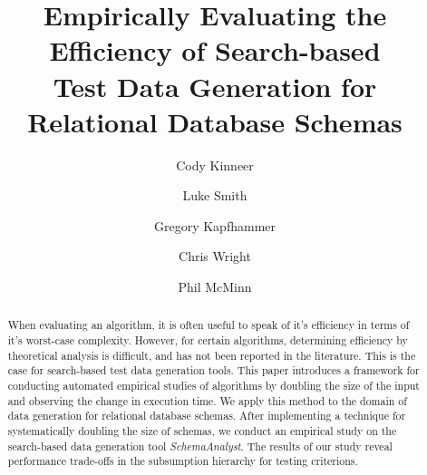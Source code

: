 \documentclass[times,10pt,twocolumn]{article}
\begin{document}
\title{Empirically Evaluating the Efficiency of Search-based \\ Test Data
Generation for Relational Database Schemas}

\author{Cody Kinneer         \and
        Luke Smith \and
        Gregory Kapfhammer \and
        Chris Wright \and
        Phil McMinn
}


\maketitle

\begin{abstract}
When evaluating an algorithm, it is often useful to speak of it's
efficiency in terms of it's worst-case complexity.  However, for certain
algorithms, determining efficiency by theoretical analysis is difficult,
and has not been reported in the literature. This is the case for
search-based test data generation tools. This paper introduces a
framework for conducting automated empirical studies of algorithms by
doubling the size of the input and observing the change in execution
time. We apply this method to the domain of data generation for
relational database schemas.  After implementing a technique for
systematically doubling the size of schemas, we conduct an empirical study
on the search-based data generation tool \textit{SchemaAnalyst}. The results of
our study reveal performance trade-offs in the subsumption hierarchy for
testing criterions.

\end{abstract}






%
%



\end{document}
